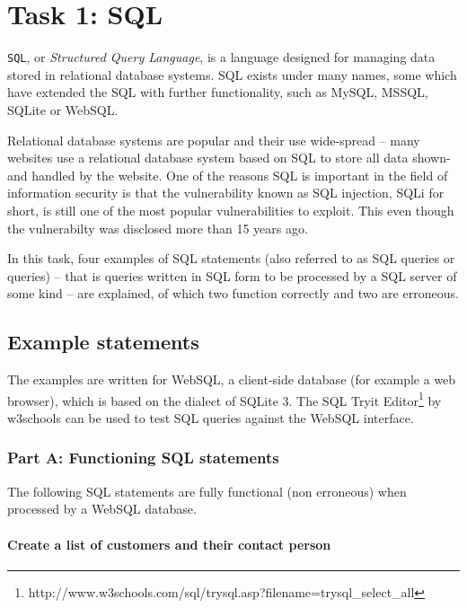 %

\section{Task 1: SQL}
\texttt{SQL}, or \textit{Structured Query Language}, is a language designed for
managing data stored in relational database systems. SQL exists under many names,
some which have extended the SQL with further functionality, such as MySQL, MSSQL,
SQLite or WebSQL.

Relational database systems are popular and their use wide-spread -- many websites
use a relational database system based on SQL to store all data shown- and handled
by the website. One of the reasons SQL is important in the field of information
security is that the vulnerability known as SQL injection, SQLi for short, is still
one of the most popular vulnerabilities to exploit\cite{MOTHBRDSQL}. This even though
the vulnerabilty was disclosed more than 15 years ago.

In this task, four examples of SQL statements (also referred to as SQL queries or queries)
-- that is queries written in SQL form to be processed by a SQL server of some kind --
are explained, of which two function correctly and two are erroneous.

\subsection{Example statements}

The examples are written for WebSQL, a client-side database\cite{W3CWEBSQL}
(for example a web browser), which is based on the dialect of SQLite 3\cite{W3CWEBSQL}.
The SQL Tryit Editor\footnote{http://www.w3schools.com/sql/trysql.asp?filename=trysql\_select\_all}
by w3schools can be used to test SQL queries against the WebSQL interface.

\subsubsection{Part A: Functioning SQL statements}
The following SQL statements are fully functional (non erroneous) when processed
by a WebSQL database.

\paragraph{Create a list of customers and their contact person}

